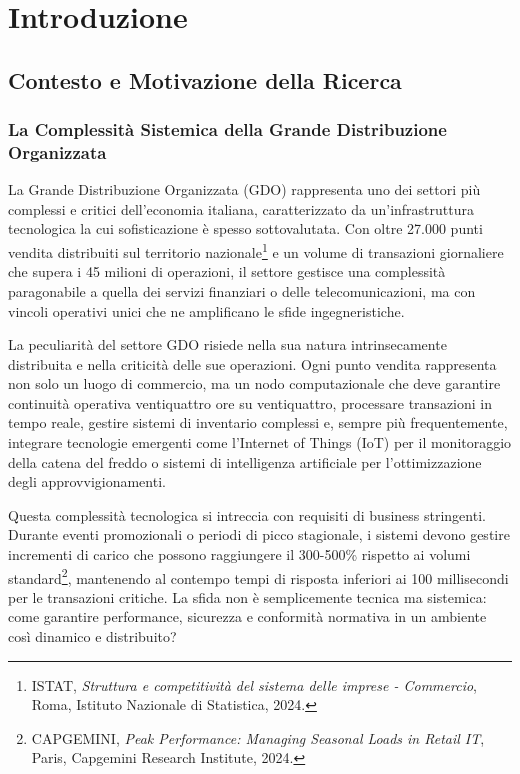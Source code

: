 \chapter{Introduzione}

\section{Contesto e Motivazione della Ricerca}

\subsection{La Complessità Sistemica della Grande Distribuzione Organizzata}

La Grande Distribuzione Organizzata (GDO) rappresenta uno dei settori più complessi e critici dell'economia italiana, caratterizzato da un'infrastruttura tecnologica la cui sofisticazione è spesso sottovalutata. Con oltre 27.000 punti vendita distribuiti sul territorio nazionale\footnote{ISTAT, \textit{Struttura e competitività del sistema delle imprese - Commercio}, Roma, Istituto Nazionale di Statistica, 2024.} e un volume di transazioni giornaliere che supera i 45 milioni di operazioni, il settore gestisce una complessità paragonabile a quella dei servizi finanziari o delle telecomunicazioni, ma con vincoli operativi unici che ne amplificano le sfide ingegneristiche.

La peculiarità del settore GDO risiede nella sua natura intrinsecamente distribuita e nella criticità delle sue operazioni. Ogni punto vendita rappresenta non solo un luogo di commercio, ma un nodo computazionale che deve garantire continuità operativa ventiquattro ore su ventiquattro, processare transazioni in tempo reale, gestire sistemi di inventario complessi e, sempre più frequentemente, integrare tecnologie emergenti come l'Internet of Things (IoT) per il monitoraggio della catena del freddo o sistemi di intelligenza artificiale per l'ottimizzazione degli approvvigionamenti.

Questa complessità tecnologica si intreccia con requisiti di business stringenti. Durante eventi promozionali o periodi di picco stagionale, i sistemi devono gestire incrementi di carico che possono raggiungere il 300-500\% rispetto ai volumi standard\footnote{CAPGEMINI, \textit{Peak Performance: Managing Seasonal Loads in Retail IT}, Paris, Capgemini Research Institute, 2024.}, mantenendo al contempo tempi di risposta inferiori ai 100 millisecondi per le transazioni critiche. La sfida non è semplicemente tecnica ma sistemica: come garantire performance, sicurezza e conformità normativa in un ambiente così dinamico e distribuito?

